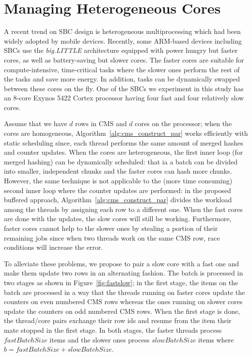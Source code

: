 \documentclass[runningheads]{llncs}
\begin{document}
\section{Managing Heterogeneous Cores} \label{sec:load}

A recent trend on SBC design is heterogeneous multiprocessing which had been widely adopted by mobile devices. Recently, some ARM-based devices including SBCs use the {\em big.LITTLE} architecture equipped with power hungry but faster cores, as well as battery-saving but slower cores. The faster cores are suitable for compute-intensive, time-critical tasks where the slower ones perform the rest of the tasks and save more energy. In addition, tasks can be dynamically swapped between these cores on the fly. One of the SBCs we experiment in this study has an 8-core Exynos 5422 Cortex processor having four fast and four relatively slow cores. 

Assume that we have $d$ rows in CMS and $d$ cores on the processor; when the cores are homogeneous, Algorithm~\ref{alg:cms_construct_par} works efficiently with static scheduling since, each thread performs the same amount of merged hashes and counter updates. When the cores are heterogeneous, the first inner loop (for merged hashing) can be dynamically  scheduled: that ia a batch can be divided into smaller, independent chunks and the faster cores can hash more chunks. 
However, the same technique is not applicable to the (more time consuming) second inner loop where the counter updates are performed: in the proposed buffered approach, Algorithm~\ref{alg:cms_construct_par} divides the workload among the threads by assigning each row to a different one. When the fast cores are done with the updates, the slow cores will still be working. Furthermore, faster cores cannot help to the slower ones by stealing a portion of their remaining jobs since when two threads work on the same CMS row, race conditions will increase the error.

To alleviate these problems, we propose to pair a slow core with a fast one and make them update two rows in an alternating fashion. The batch is processed in two stages as shown in Figure~\ref{fig:fastslow}; in the first stage, the items on the batch are processed in a way that the threads running on faster cores update the counters on even numbered CMS rows whereas the ones running on slower cores update the counters on odd numbered CMS rows. When the first stage is done, the thread/core pairs exchange their row ids and resume from the item their mate stopped in the first stage. In both stages, the faster threads process $fastBatchSize$ items and the slower ones process $slowBatchSize$ items where $b = fastBatchSize + slowBatchSize.$\vspace*{-2ex}
\end{document}
